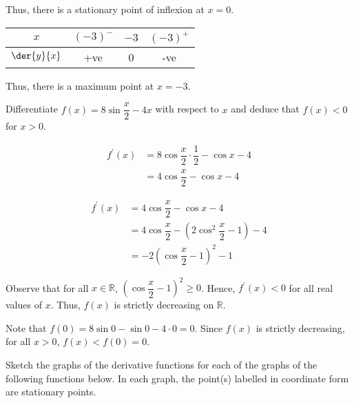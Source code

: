\documentclass{jhwhw}
\begin{document}
        Thus, there is a stationary point of inflexion at $x = 0$.

        \begin{table}[h]
            \centering
            \begin{tabular}{|c|c|c|c|}
            \hline
            $x$          & $(-3)^-$ & $-3$ & $(-3)^+$ \\\hline
            $\der{y}{x}$ & +ve   & 0 & -ve   \\[1ex]\hline
            \end{tabular}
        \end{table}

        Thus, there is a maximum point at $x=-3$.


    \problem{}
        Differentiate $f(x) = 8\sin \dfrac{x}2 - 4x$ with respect to $x$ and deduce that $f(x) < 0$ for $x>0$.

    \solution
        \begin{align*}
            f^\prime(x) &= 8\cos \dfrac{x}2 \cdot \dfrac12 - \cos x - 4\\
            &= 4\cos\dfrac{x}2 - \cos x- 4
        \end{align*}


        \begin{align*}
            f^\prime(x) &= 4\cos\dfrac{x}2 - \cos x- 4\\
            &= 4\cos \dfrac{x}2 - (2\cos^2 \dfrac{x}2 - 1) - 4\\
            &= -2\left(\cos\dfrac{x}2 - 1\right)^2 - 1
        \end{align*}

        Observe that for all $x \in \mathbb{R}$, $\left(\cos\dfrac{x}2 - 1\right)^2 \geq 0$. Hence, $f^\prime(x) < 0$ for all real values of $x$. Thus, $f(x)$ is strictly decreasing on $\mathbb{R}$.

        Note that $f(0) = 8\sin 0 - \sin 0 - 4 \cdot 0 = 0$. Since $f(x)$ is strictly decreasing, for all $x > 0$, $f(x) < f(0) = 0$.

    \problem{}
        Sketch the graphs of the derivative functions for each of the graphs of the following functions below. In each graph, the point(s) labelled in coordinate form are stationary points.
\end{document}
